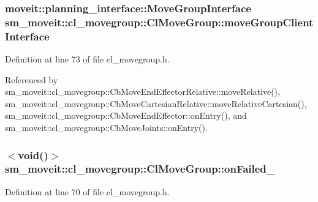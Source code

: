 \subsubsection[{\texorpdfstring{move\+Group\+Client\+Interface}{moveGroupClientInterface}}]{\setlength{\rightskip}{0pt plus 5cm}moveit\+::planning\+\_\+interface\+::\+Move\+Group\+Interface sm\+\_\+moveit\+::cl\+\_\+movegroup\+::\+Cl\+Move\+Group\+::move\+Group\+Client\+Interface}\hypertarget{classsm__moveit_1_1cl__movegroup_1_1ClMoveGroup_a23acf6883455566dbab30e4367c2144d}{}\label{classsm__moveit_1_1cl__movegroup_1_1ClMoveGroup_a23acf6883455566dbab30e4367c2144d}


Definition at line 73 of file cl\+\_\+movegroup.\+h.



Referenced by sm\+\_\+moveit\+::cl\+\_\+movegroup\+::\+Cb\+Move\+End\+Effector\+Relative\+::move\+Relative(), sm\+\_\+moveit\+::cl\+\_\+movegroup\+::\+Cb\+Move\+Cartesian\+Relative\+::move\+Relative\+Cartesian(), sm\+\_\+moveit\+::cl\+\_\+movegroup\+::\+Cb\+Move\+End\+Effector\+::on\+Entry(), and sm\+\_\+moveit\+::cl\+\_\+movegroup\+::\+Cb\+Move\+Joints\+::on\+Entry().

\subsubsection[{\texorpdfstring{on\+Failed\+\_\+}{onFailed_}}]{$<$void()$>$ sm\+\_\+moveit\+::cl\+\_\+movegroup\+::\+Cl\+Move\+Group\+::on\+Failed\+\_\+\hspace{0.3cm}{\ttfamily [private]}}\hypertarget{classsm__moveit_1_1cl__movegroup_1_1ClMoveGroup_ab4d03a5e64608a13458d740ce1536c8e}{}\label{classsm__moveit_1_1cl__movegroup_1_1ClMoveGroup_ab4d03a5e64608a13458d740ce1536c8e}


Definition at line 70 of file cl\+\_\+movegroup.\+h.

